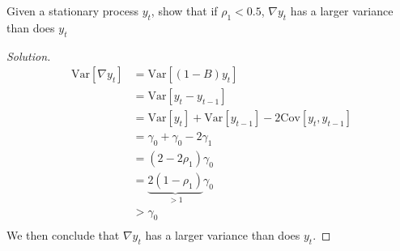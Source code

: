 \documentclass[UTF8,a4paper,14pt]{ctexart}
\newcommand{\Var}{\mathrm{Var}}
\newcommand{\Cov}{\mathrm{Cov}}
\newenvironment{solution}
  {\renewcommand\qedsymbol{$\blacksquare$}\begin{proof}[Solution]}
  {\end{proof}}
\theoremstyle{definition}
\theoremstyle{remark}
\begin{document}
\pagebreak
\begin{Problem}{}
  Given a stationary process \(y_t\), show that if \(\rho_1 < 0.5\), \(\nabla y_t\) has a larger variance than does \(y_t\)
\end{Problem}

\begin{solution}
  \begin{equation}\
    \begin{aligned}
      \Var[\nabla y_t]
     &= \Var[(1-B)y_{t}] \\
     &= \Var[y_{t}-y_{t-1}]\\
     &=\Var[y_{t}]+\Var[y_{t-1}]-2\Cov[y_{t},y_{t-1}]\\
     &=\gamma_0+\gamma_0-2\gamma_1\\
     &=(2-2\rho_1)\gamma_0\\
     &=\underset{>1}{\underbrace{2(1-\rho_1)}}\gamma_0\\
     &>\gamma_0\\
    \end{aligned}
  \end{equation}
  We then conclude that \(\nabla y_t\) has a larger variance than does \(y_t\).
\end{solution}
\end{document}
